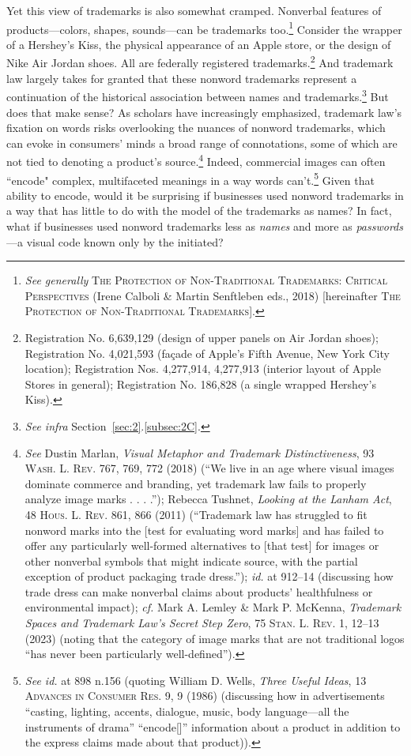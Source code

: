 \documentclass[letterpaper, 11pt, oneside]{article}
\begin{document}
Yet this view of trademarks is also somewhat cramped. Nonverbal features of products—colors, shapes, sounds—can be trademarks too.\footnote{\textit{See generally} \textsc{The Protection of Non-Traditional Trademarks: Critical Perspectives} (Irene Calboli \& Martin Senftleben eds., 2018) [hereinafter \textsc{The Protection of Non-Traditional Trademarks}].} Consider the wrapper of a Hershey’s Kiss, the physical appearance of an Apple store, or the design of Nike Air Jordan shoes. All are federally registered trademarks.\footnote{Registration No. 6,639,129 (design of upper panels on Air Jordan shoes); Registration No. 4,021,593 (façade of Apple's Fifth Avenue, New York City location); Registration Nos. 4,277,914, 4,277,913 (interior layout of Apple Stores in general); Registration No. 186,828 (a single wrapped Hershey's Kiss).} And trademark law largely takes for granted that these nonword trademarks represent a continuation of the historical association between names and trademarks.\footnote{\textit{See infra} Section~\ref{sec:2}.\ref{subsec:2C}.} But does that make sense? As scholars have increasingly emphasized, trademark law's fixation on words risks overlooking the nuances of nonword trademarks, which can evoke in consumers' minds a broad range of connotations, some of which are not tied to denoting a product's source.\footnote{\label{supra3} \textit{See} Dustin Marlan, \textit{Visual Metaphor and Trademark Distinctiveness}, 93 \textsc{Wash. L. Rev.} 767, 769, 772 (2018) (``We live in an age where visual images dominate commerce and branding, yet trademark law fails to properly analyze image marks . . . .''); Rebecca Tushnet, \textit{Looking at the Lanham Act}, 48 \textsc{Hous. L. Rev.} 861, 866 (2011) (``Trademark law has struggled to fit nonword marks into the [test for evaluating word marks] and has failed to offer any particularly well-formed alternatives to [that test] for images or other nonverbal symbols that might indicate source, with the partial exception of product packaging trade dress.''); \textit{id.} at 912–14 (discussing how trade dress can make nonverbal claims about products' healthfulness or environmental impact); \textit{cf.} Mark A. Lemley \& Mark P. McKenna, \textit{Trademark Spaces and Trademark Law’s Secret Step Zero}, 75 \textsc{Stan. L. Rev.} 1, 12–13 (2023) (noting that the category of image marks that are not traditional logos ``has never been particularly well-defined'').} Indeed, commercial images can often ``encode" complex, multifaceted meanings in a way words can't.\footnote{\textit{See id.} at 898 n.156 (quoting William D. Wells, \textit{Three Useful Ideas}, 13 \textsc{Advances in Consumer Res.} 9, 9 (1986) (discussing how in advertisements ``casting, lighting, accents, dialogue, music, body language—all the instruments of drama'' ``encode[]'' information about a product in addition to the express claims made about that product)).} Given that ability to encode, would it be surprising if businesses used nonword trademarks in a way that has little to do with the model of the trademarks as names? In fact, what if businesses used nonword trademarks less as \textit{names} and more as \textit{passwords}—a visual code known only by the initiated?
\end{document}
